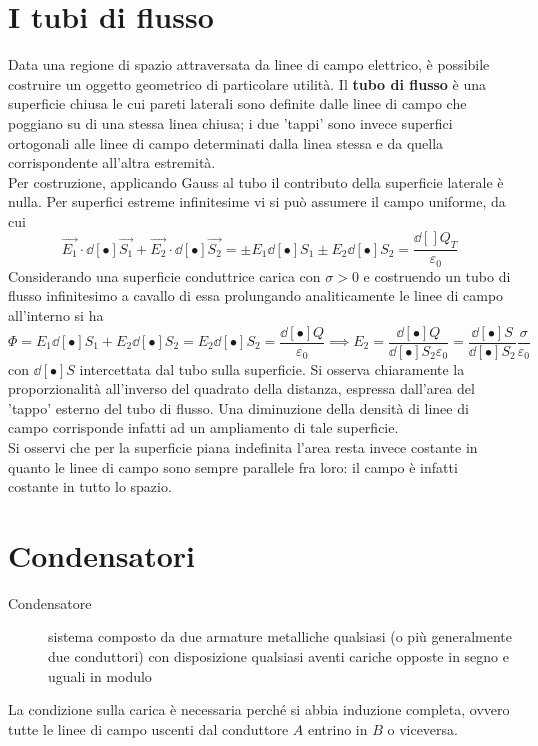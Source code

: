 \section{I tubi di flusso}
Data una regione di spazio attraversata da linee di campo elettrico, è possibile costruire un oggetto geometrico di particolare utilità. Il \textbf{tubo di flusso} è una superficie chiusa le cui pareti laterali sono definite dalle linee di campo che poggiano su di una stessa linea chiusa; i due 'tappi' sono invece superfici ortogonali alle linee di campo determinati dalla linea stessa e da quella corrispondente all'altra estremità.
\\Per costruzione, applicando Gauss al tubo il contributo della superficie laterale è nulla. Per superfici estreme infinitesime vi si può assumere il campo uniforme, da cui
\[\vec{E_1} \cdot \dd[•]{\vec{S_1}} + \vec{E_2} \cdot \dd[•]{\vec{S_2}} = \pm E_1 \dd[•]{S_1} \pm E_2 \dd[•]{S_2} = \frac{\dd[]{Q_T}}{\varepsilon_0}\]
Considerando una superficie conduttrice carica con $\sigma > 0$ e costruendo un tubo di flusso infinitesimo a cavallo di essa prolungando analiticamente le linee di campo all'interno si ha
\[\Phi = E_1 \dd[•]{S_1} + E_2 \dd[•]{S_2} = E_2 \dd[•]{S_2} = \frac{\dd[•]{Q}}{\varepsilon_0} \implies E_2 = \frac{\dd[•]{Q}}{\dd[•]{S_2} \varepsilon_0} = \frac{\dd[•]{S}}{\dd[•]{S_2}} \frac{\sigma}{\varepsilon_0}\]
con $\dd[•]{S}$ intercettata dal tubo sulla superficie. Si osserva chiaramente la proporzionalità all'inverso del quadrato della distanza, espressa dall'area del 'tappo' esterno del tubo di flusso. Una diminuzione della densità di linee di campo corrisponde infatti ad un ampliamento di tale superficie.
\\Si osservi che per la superficie piana indefinita l'area resta invece costante in quanto le linee di campo sono sempre parallele fra loro: il campo è infatti costante in tutto lo spazio.

\section{Condensatori}
\begin{description}
\item[Condensatore] sistema composto da due armature metalliche qualsiasi (o più generalmente due conduttori) con disposizione qualsiasi aventi cariche opposte in segno e uguali in modulo
\end{description}
La condizione sulla carica è necessaria perché si abbia induzione completa, ovvero tutte le linee di campo uscenti dal conduttore $A$ entrino in $B$ o viceversa.

